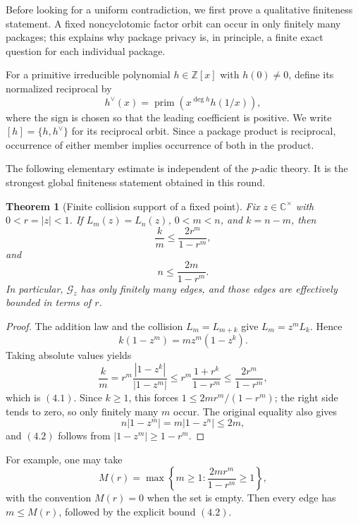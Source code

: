 \documentclass[11pt]{article}
\newtheorem{theorem}{Theorem}[section]
\theoremstyle{definition}
\newcommand{\Z}{\mathbb Z}
\newcommand{\C}{\mathbb C}
\begin{document}
Before looking for a uniform contradiction, we first prove a qualitative finiteness statement.  A fixed noncyclotomic factor orbit can occur in only finitely many packages; this explains why package privacy is, in principle, a finite exact question for each individual package.

For a primitive irreducible polynomial \(h\in\Z[x]\) with \(h(0)\neq0\),
define its normalized reciprocal by
\[
 h^\vee(x)=\operatorname{prim}\!\left(x^{\deg h}h(1/x)\right),
\]
where the sign is chosen so that the leading coefficient is positive.  We
write \([h]=\{h,h^\vee\}\) for its reciprocal orbit.  Since a package
product is reciprocal, occurrence of either member implies occurrence of both
in the product.

The following elementary estimate is independent of the \(p\)-adic theory.
It is the strongest global finiteness statement obtained in this round.

\begin{theorem}[Finite collision support of a fixed point]
\label{thm:pointfinite}
Fix \(z\in\C^\times\) with \(0<r=|z|<1\).  If
\(L_m(z)=L_n(z)\), \(0<m<n\), and \(k=n-m\), then
\begin{equation}
 \frac{k}{m}
 \leq \frac{2r^m}{1-r^m},
 \tag{4.1}
\end{equation}
and
\begin{equation}
 n\leq\frac{2m}{1-r^m}.
 \tag{4.2}
\end{equation}
In particular, \(\mathcal G_z\) has only finitely many edges, and those edges
are effectively bounded in terms of \(r\).
\end{theorem}

\begin{proof}
The addition law and the collision \(L_m=L_{m+k}\) give
\(L_m=z^mL_k\).  Hence
\[
 k(1-z^m)=mz^m(1-z^k).
\]
Taking absolute values yields
\[
 \frac{k}{m}
 =r^m\frac{|1-z^k|}{|1-z^m|}
 \leq r^m\frac{1+r^k}{1-r^m}
 \leq\frac{2r^m}{1-r^m},
\]
which is \((4.1)\).  Since \(k\geq1\), this forces
\(1\leq2mr^m/(1-r^m)\); the right side tends to zero, so only finitely
many \(m\) occur.  The original equality also gives
\[
 n|1-z^m|=m|1-z^n|\leq2m,
\]
and \((4.2)\) follows from \(|1-z^m|\geq1-r^m\).
\end{proof}

For example, one may take
\[
 M(r)=\max\left\{m\geq1:\frac{2mr^m}{1-r^m}\geq1\right\},
\]
with the convention \(M(r)=0\) when the set is empty.  Then every edge has
\(m\leq M(r)\), followed by the explicit bound \((4.2)\).
\end{document}
